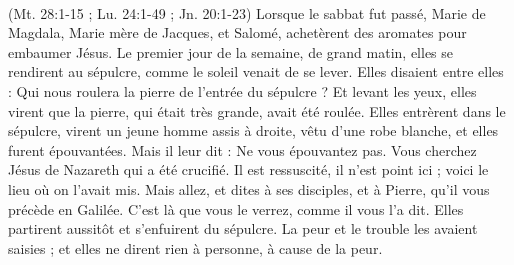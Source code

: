 \begin{multicols}{2}
{\\(Mt. 28:1-15 ; Lu. 24:1-49 ; Jn. 20:1-23)}
\VerseOne{}Lorsque le sabbat fut passé, Marie de Magdala, Marie mère de Jacques, et Salomé, achetèrent des aromates pour embaumer Jésus.
Le premier jour de la semaine, de grand matin, elles se rendirent au sépulcre, comme le soleil venait de se lever.
Elles disaient entre elles : Qui nous roulera la pierre de l'entrée du sépulcre ?
Et levant les yeux, elles virent que la pierre, qui était très grande, avait été roulée.
Elles entrèrent dans le sépulcre, virent un jeune homme assis à droite, vêtu d'une robe blanche, et elles furent épouvantées.
Mais il leur dit : Ne vous épouvantez pas. Vous cherchez Jésus de Nazareth qui a été crucifié. Il est ressuscité, il n'est point ici ; voici le lieu où on l'avait mis.
Mais allez, et dites à ses disciples, et à Pierre, qu'il vous précède en Galilée. C’est là que vous le verrez, comme il vous l'a dit.
Elles partirent aussitôt et s'enfuirent du sépulcre. La peur et le trouble les avaient saisies ; et elles ne dirent rien à personne, à cause de la peur.

\end{multicols}
